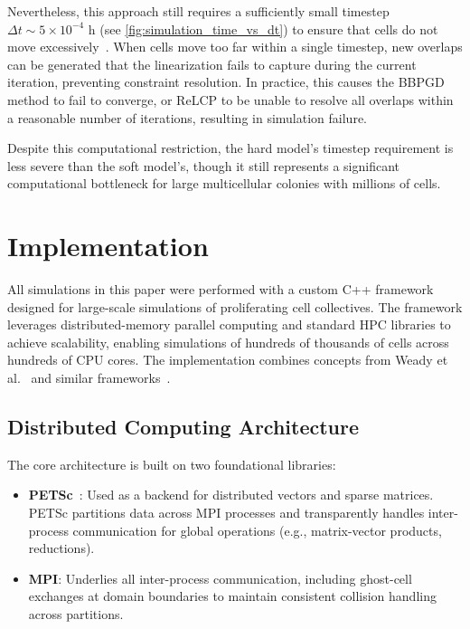 \documentclass[conference]{IEEEtran}
\begin{document}
Nevertheless, this approach still requires a sufficiently small timestep $\Delta t \sim 5 \times 10^{-4}$ h (see \autoref{fig:simulation_time_vs_dt}) to ensure that cells do not move excessively~\cite{Yan2022}. When cells move too far within a single timestep, new overlaps can be generated that the linearization fails to capture during the current iteration, preventing constraint resolution. In practice, this causes the BBPGD method to fail to converge, or ReLCP to be unable to resolve all overlaps within a reasonable number of iterations, resulting in simulation failure.

Despite this computational restriction, the hard model's timestep requirement is less severe than the soft model's, though it still represents a significant computational bottleneck for large multicellular colonies with millions of cells.

\section{Implementation}

All simulations in this paper were performed with a custom C++ framework designed for large-scale simulations of proliferating cell collectives. The framework leverages distributed-memory parallel computing and standard HPC libraries to achieve scalability, enabling simulations of hundreds of thousands of cells across hundreds of CPU cores. The implementation combines concepts from Weady et al.~\cite{Weady2024SM} and similar frameworks~\cite{Tasora2008,Yan2019}.

\subsection{Distributed Computing Architecture}

The core architecture is built on two foundational libraries:
\begin{itemize}
    \item \textbf{PETSc}~\cite{petsc-web-page}: Used as a backend for distributed vectors and sparse matrices. PETSc partitions data across MPI processes and transparently handles inter-process communication for global operations (e.g., matrix-vector products, reductions).
    \item \textbf{MPI}: Underlies all inter-process communication, including ghost-cell exchanges at domain boundaries to maintain consistent collision handling across partitions.
\end{itemize}
\end{document}
